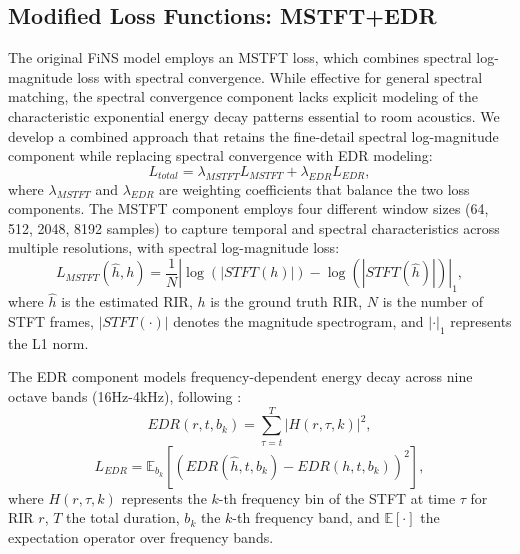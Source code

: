 \documentclass[conference]{IEEEtran}
\begin{document}
 
\subsection{Modified Loss Functions: MSTFT+EDR}
 
The original FiNS model employs an MSTFT loss, which combines spectral log-magnitude loss with spectral convergence. While effective for general spectral matching, the spectral convergence component lacks explicit modeling of the characteristic exponential energy decay patterns essential to room acoustics. We develop a combined approach that retains the fine-detail spectral log-magnitude component while replacing spectral convergence with EDR modeling:
\begin{equation}
L_{total} = \lambda_{MSTFT} L_{MSTFT} + \lambda_{EDR} L_{EDR},
\end{equation}
where $\lambda_{MSTFT}$ and $\lambda_{EDR}$ are weighting coefficients that balance the two loss components. The MSTFT component employs four different window sizes (64, 512, 2048, 8192 samples) to capture temporal and spectral characteristics across multiple resolutions, with spectral log-magnitude loss:
\begin{equation}
L_{MSTFT}(\hat{h}, h) = \frac{1}{N}| \log(|STFT(h)|) - \log(|STFT(\hat{h})|) |_1,
\end{equation}
where $\hat{h}$ is the estimated RIR, $h$ is the ground truth RIR, $N$ is the number of STFT frames, $|STFT(\cdot)|$ denotes the magnitude spectrogram, and $|\cdot|_1$ represents the L1 norm.
 
The EDR component models frequency-dependent energy decay across nine octave bands (16Hz-4kHz), following \cite{ratnarajah2023towards}:
\begin{equation}
EDR(r, t, b_k) = \sum_{\tau=t}^T |H(r, \tau, k)|^2,
\end{equation}
\begin{equation}
L_{EDR} = \mathbb{E}_{b_k}[(EDR(\hat{h}, t, b_k) - EDR(h, t, b_k))^2],
\end{equation}
where $H(r, \tau, k)$ represents the $k$-th frequency bin of the STFT at time $\tau$ for RIR $r$, $T$ the total duration, $b_k$ the $k$-th frequency band, and $\mathbb{E}[\cdot]$ the expectation operator over frequency bands.
 
 
\end{document}
